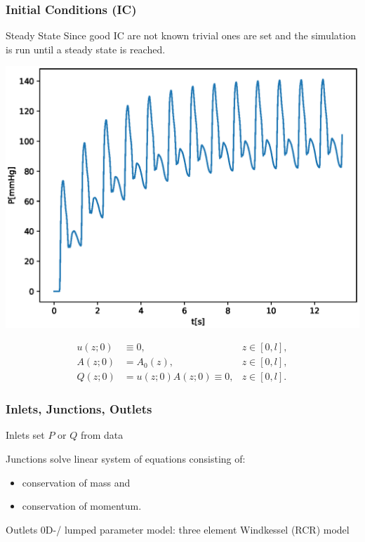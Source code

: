 \documentclass{beamer}
\begin{document}
\begin{frame}
	\frametitle{Initial Conditions (IC)}
	\begin{center}
		\begin{minipage}{0.39\textwidth}
			\begin{block}{Steady State}
				Since good IC are not known trivial ones are set and the simulation is run until a steady state is reached.
			\end{block}

		\end{minipage}
		\begin{minipage}{0.59\textwidth}
			\includegraphics[width=\textwidth]{images/adan56_tibiofibular_trunk_L_P_steady_state.eps}
		\end{minipage}
		\hfill
		\begin{align}
			u(z;0) &\equiv 0, &z \in [0,l],\\
			A(z;0) &= A_0(z), &z \in [0,l], \\
			Q(z;0) &= u(z;0)A(z;0) \equiv 0, &z \in [0,l].
		\end{align}
	\end{center}
\end{frame}
\begin{frame}
	\frametitle{Inlets, Junctions, Outlets}
	\begin{block}{Inlets}
		set $P$ or $Q$ from data 	
	\end{block}
	\begin{block}{Junctions}
		solve linear system of equations consisting of:
		\begin{itemize}
			\item conservation of mass and
			\item conservation of momentum.
		\end{itemize}
	\end{block}
	\begin{block}{Outlets}
		0D-/ lumped parameter model: three element Windkessel (RCR) model 
	\end{block}
\end{frame}
\end{document}
